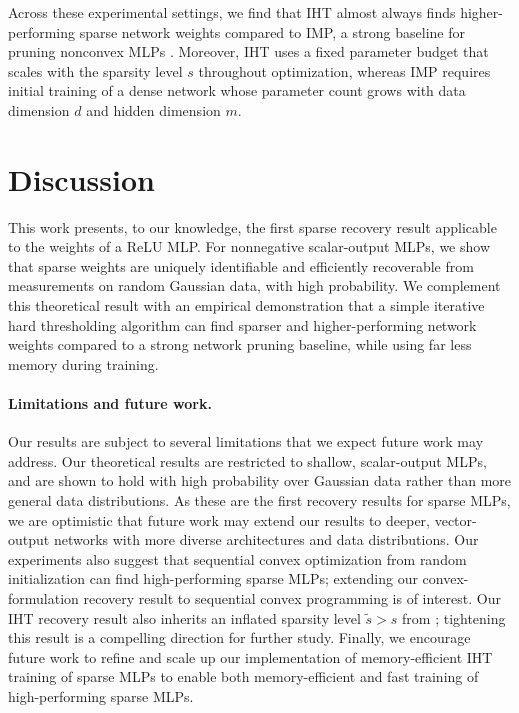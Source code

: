 \documentclass{article} %
\newcommand{\m}{\ensuremath{m}}
\newcommand{\datadim}{\ensuremath{d}}
\newcommand{\1}{\ensuremath{{\sf (i)}}}
\newcommand{\2}{\ensuremath{{\sf (ii)}}}
\newcommand{\3}{\ensuremath{{\sf (iii)}}}
\newcommand{\4}{\ensuremath{{\sf (iv)}}}
\newcommand{\5}{\ensuremath{{\sf (v)}}}
\newcommand{\6}{\ensuremath{{\sf (vi)}}}
\begin{document}
Across these experimental settings, we find that IHT almost always finds higher-performing sparse network weights compared to IMP, a strong baseline for pruning nonconvex MLPs \citep{frankle2021pruning}. Moreover, IHT uses a fixed parameter budget that scales with the sparsity level $s$ throughout optimization, whereas IMP requires initial training of a dense network whose parameter count grows with data dimension $\datadim$ and hidden dimension $\m$. 



\section{Discussion}
\label{sec:discussion}


This work presents, to our knowledge, the first sparse recovery result applicable to the weights of a ReLU MLP. For nonnegative scalar-output MLPs, we show that sparse weights are uniquely identifiable and efficiently recoverable from measurements on random Gaussian data, with high probability. We complement this theoretical result with an empirical demonstration that a simple iterative hard thresholding algorithm can find sparser and higher-performing network weights compared to a strong network pruning baseline, while using far less memory during training. 

\paragraph{Limitations and future work.}
Our results are subject to several limitations that we expect future work may address. Our theoretical results are restricted to shallow, scalar-output MLPs, and are shown to hold with high probability over Gaussian data rather than more general data distributions. As these are the first recovery results for sparse MLPs, we are optimistic that future work may extend our results to deeper, vector-output networks with more diverse architectures and data distributions. 
Our experiments also suggest that sequential convex optimization from random initialization can find high-performing sparse MLPs; extending our convex-formulation recovery result to sequential convex programming is of interest.
Our IHT recovery result also inherits an inflated sparsity level $\tilde s > s$ from \citet{jain2014iterative}; tightening this result is a compelling direction for further study. Finally, we encourage future work to refine and scale up our implementation of memory-efficient IHT training of sparse MLPs to enable both memory-efficient and fast training of high-performing sparse MLPs. 
\end{document}
